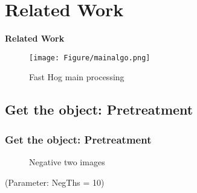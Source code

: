 \documentclass{beamer}
\begin{document}
\section{Related Work}
\begin{frame}
\textbf{Related Work}
\end{frame}



\begin{frame}
\thispagestyle{empty}
\begin{figure}[H]
\centering
\begin{minipage}[b]{0.9\textheight}
\texttt{[image: Figure/mainalgo.png]}
\end{minipage}
\caption{Fast Hog main processing}
\end{figure}
\end{frame}



\subsection{Get the object: Pretreatment}
\begin{frame}
\frametitle{Get the object: Pretreatment}
\begin{figure}[H]
\centering
{}
\caption{Negative two images}
\end{figure}
(Parameter: NegThs = 10)
\end{frame}
\end{document}
